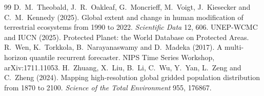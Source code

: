 \documentclass[11pt,a4paper]{article}
\begin{document}
\begin{thebibliography}{99}
D.~M.~Theobald, J.~R.~Oakleaf, G.~Moncrieff, M.~Voigt, J.~Kiesecker and C.~M.~Kennedy (2025).
Global extent and change in human modification of terrestrial ecosystems from 1990 to 2022.
\emph{Scientific Data} 12, 606.
UNEP-WCMC and IUCN (2025). Protected Planet: the World Database on Protected Areas.
R.~Wen, K.~Torkkola, B.~Narayanaswamy and D.~Madeka (2017). A multi-horizon quantile recurrent
forecaster. NIPS Time Series Workshop, arXiv:1711.11053.
H.~Zhuang, X.~Liu, B.~Li, C.~Wu, Y.~Yan, L.~Zeng and C.~Zheng (2024). Mapping high-resolution
global gridded population distribution from 1870 to 2100. \emph{Science of the Total
Environment} 955, 176867.
\end{thebibliography}
\end{document}
